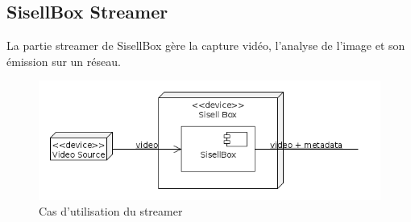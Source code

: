 \subsection{SisellBox Streamer}
La partie streamer de SisellBox gère la capture vidéo, l'analyse de l'image et son émission sur un réseau.

\begin{figure}[!h]
  \centering
  \includegraphics[scale=0.7]{figures/sisell_box}
  \caption{Cas d'utilisation du streamer}
\end{figure}


